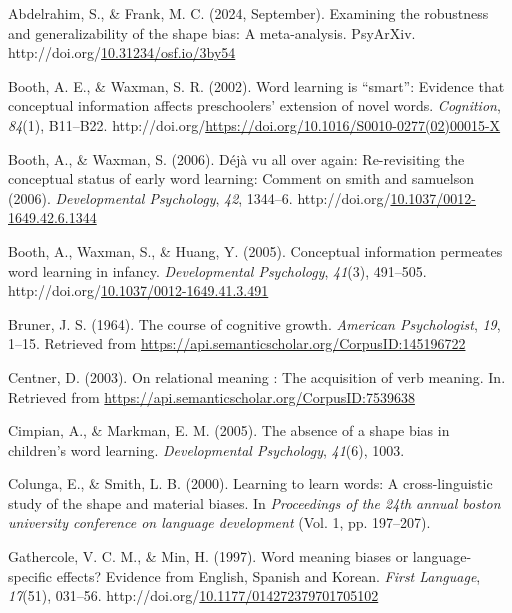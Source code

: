 \documentclass[10pt, letterpaper]{article}
\begin{document}
\label{refs}
\begin{CSLReferences}{1}{0}
Abdelrahim, S., \& Frank, M. C. (2024, September). Examining the
robustness and generalizability of the shape bias: A meta-analysis.
PsyArXiv.
http://doi.org/\href{https://doi.org/10.31234/osf.io/3by54}{10.31234/osf.io/3by54}

Booth, A. E., \& Waxman, S. R. (2002). Word learning is {``smart''}:
Evidence that conceptual information affects preschoolers' extension of
novel words. \emph{Cognition}, \emph{84}(1), B11--B22.
http://doi.org/\url{https://doi.org/10.1016/S0010-0277(02)00015-X}

Booth, A., \& Waxman, S. (2006). Déjà vu all over again: Re-revisiting
the conceptual status of early word learning: Comment on smith and
samuelson (2006). \emph{Developmental Psychology}, \emph{42}, 1344--6.
http://doi.org/\href{https://doi.org/10.1037/0012-1649.42.6.1344}{10.1037/0012-1649.42.6.1344}

Booth, A., Waxman, S., \& Huang, Y. (2005). Conceptual information
permeates word learning in infancy. \emph{Developmental Psychology},
\emph{41}(3), 491--505.
http://doi.org/\href{https://doi.org/10.1037/0012-1649.41.3.491}{10.1037/0012-1649.41.3.491}

Bruner, J. S. (1964). The course of cognitive growth. \emph{American
Psychologist}, \emph{19}, 1--15. Retrieved from
\url{https://api.semanticscholar.org/CorpusID:145196722}

Centner, D. (2003). On relational meaning : The acquisition of verb
meaning. In. Retrieved from
\url{https://api.semanticscholar.org/CorpusID:7539638}

Cimpian, A., \& Markman, E. M. (2005). The absence of a shape bias in
children's word learning. \emph{Developmental Psychology}, \emph{41}(6),
1003.

Colunga, E., \& Smith, L. B. (2000). Learning to learn words: A
cross-linguistic study of the shape and material biases. In
\emph{Proceedings of the 24th annual boston university conference on
language development} (Vol. 1, pp. 197--207).

Gathercole, V. C. M., \& Min, H. (1997). Word meaning biases or
language-specific effects? {Evidence} from {English}, {Spanish} and
{Korean}. \emph{First Language}, \emph{17}(51), 031--56.
http://doi.org/\href{https://doi.org/10.1177/014272379701705102}{10.1177/014272379701705102}


\end{CSLReferences}
\end{document}
